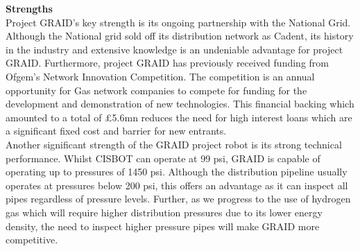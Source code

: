\documentclass[11pt]{article}		%
\begin{document}
			\textbf{Strengths} \\
			Project GRAID's key strength is its ongoing partnership with the National Grid. Although the National grid sold off its distribution network as Cadent, its history in the industry and extensive knowledge is an undeniable advantage for project GRAID. Furthermore, project GRAID has previously received funding from Ofgem's Network Innovation Competition. The competition is an annual opportunity for Gas network companies to compete for funding for the development and demonstration of new technologies. This financial backing which amounted to a total of £5.6mn reduces the need for high interest loans which are a significant fixed cost and barrier for new entrants. \\
		    \hspace*{3ex}Another significant strength of the GRAID project robot is its strong technical performance. Whilst CISBOT can operate at 99 psi, GRAID is capable of operating up to pressures of 1450 psi. Although the distribution pipeline usually operates at pressures below 200 psi, this offers an advantage as it can inspect all pipes regardless of pressure levels. Further, as we progress to the use of hydrogen gas which will require higher distribution pressures due to its lower energy density, the need to inspect higher pressure pipes will make GRAID more competitive. 
	        
\end{document}
